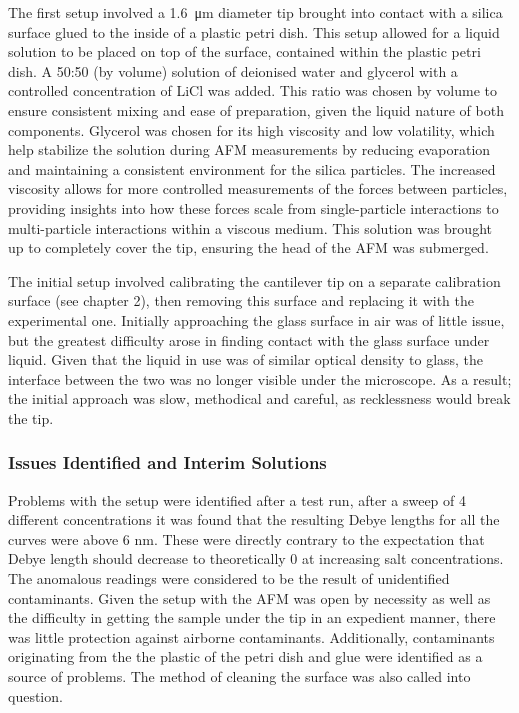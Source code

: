 The first setup involved a \SI{1.6}{\micro\metre} diameter tip brought into contact with a silica surface glued to the inside of a plastic petri dish. This setup allowed for a liquid solution to be placed on top of the surface, contained within the plastic petri dish. A 50:50 (by volume) solution of deionised water and glycerol with a controlled concentration of LiCl was added. This ratio was chosen by volume to ensure consistent mixing and ease of preparation, given the liquid nature of both components. Glycerol was chosen for its high viscosity and low volatility, which help stabilize the solution during AFM measurements by reducing evaporation and maintaining a consistent environment for the silica particles. The increased viscosity allows for more controlled measurements of the forces between particles, providing insights into how these forces scale from single-particle interactions to multi-particle interactions within a viscous medium. This solution was brought up to completely cover the tip, ensuring the head of the AFM was submerged.

The initial setup involved calibrating the cantilever tip on a separate calibration surface (see chapter 2), then removing this surface and replacing it with the experimental one. Initially approaching the glass surface in air was of little issue, but the greatest difficulty arose in finding contact with the glass surface under liquid. Given that the liquid in use was of similar optical density to glass, the interface between the two was no longer visible under the microscope. As a result; the initial approach was slow, methodical and careful, as recklessness would break the tip. 

\subsubsection{Issues Identified and Interim Solutions}

Problems with the setup were identified after a test run, after a sweep of 4 different concentrations it was found that the resulting Debye lengths for all the curves were above 6 nm. These were directly contrary to the expectation that Debye length should decrease to theoretically 0 at increasing salt concentrations. The anomalous readings were considered to be the result of unidentified contaminants. Given the setup with the AFM was open by necessity as well as the difficulty in getting the sample under the tip in an expedient manner, there was little protection against airborne contaminants. Additionally, contaminants originating from the the plastic of the petri dish and glue were identified as a source of problems. The method of cleaning the surface was also called into question. %

